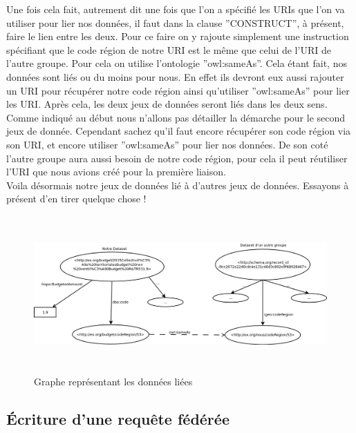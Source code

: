 \documentclass[a4paper,sffamily,12pt]{article}
\begin{document}
			\indent Une fois cela fait, autrement dit une fois que l'on a spécifié les URIs que l'on va utiliser pour lier nos données, il faut dans la clause ''CONSTRUCT'', à présent, faire le lien entre les deux. Pour ce faire on y rajoute simplement une instruction spécifiant que le code région de notre URI est le même que celui de l'URI de l'autre groupe. Pour cela on utilise l'ontologie ''owl:sameAs''. Cela étant fait, nos données sont liés ou du moins pour nous. En effet ils devront eux aussi rajouter un URI pour récupérer notre code région  ainsi qu'utiliser ''owl:sameAs'' pour lier les URI. Après cela, les deux jeux de données seront liés dans les deux sens. \\
			
			\indent Comme indiqué au début nous n'allons pas détailler la démarche pour le second jeux de donnée. Cependant sachez qu'il faut encore récupérer son code région via son URI, et encore utiliser ''owl:sameAs'' pour lier nos données. De son coté l'autre groupe aura aussi besoin de notre code région, pour cela il peut réutiliser l'URI que nous avions créé pour la première liaison. \\
			
			\indent Voila désormais notre jeux de données lié à d'autres jeux de données. Essayons à présent d'en tirer quelque chose !

			\vspace{0.5cm}			
	
			\begin{figure}[!h]
				
				\centerline{\includegraphics[height=6cm]{picture/graphe_linked_data.png}}
				\caption{Graphe représentant les données liées}
				\label{graphe}
				
			\end{figure}	
								
			\vspace{0.5cm}
			
		\subsection{Écriture d'une requête fédérée}
			
\end{document}
